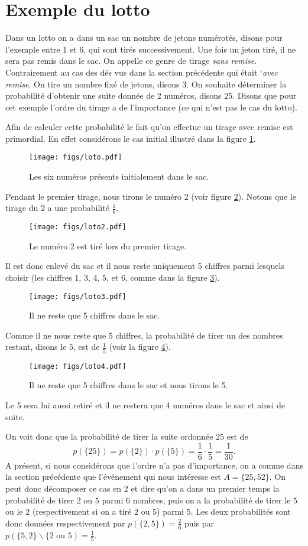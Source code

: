 \documentclass[a4paper,12pt]{book}
\begin{document}
\section{Exemple du lotto}
Dans un lotto on a dans un sac un nombre de jetons numérotés, disons pour l'exemple entre 1 et 6, 
qui sont tirés successivement. Une fois un jeton tiré, il ne sera pas remis dans le sac. 
On appelle ce genre de tirage \textit{sans remise}. Contrairement au cas des dés vus dans 
la section précédente qui était `\textit{avec remise}.
On tire un nombre fixé de jetons, disons 3. On souhaite déterminer la probabilité d'obtenir
une suite donnée de 2 numéros, disons $25$. Disons que pour cet exemple l'ordre du tirage a de l'importance
(ce qui n'est pas le cas du lotto).

Afin de calculer cette probabilité le fait qu'on effectue un tirage avec remise est primordial.
En effet considérons le cas initial illustré dans la figure \ref{fig_loto}.
\begin{figure}[htp]
\texttt{[image: figs/loto.pdf]}
\caption{Les six numéros présents initialement dans le sac.}\label{fig_loto}
\end{figure}
Pendant le premier tirage, nous tirons le numéro 2 (voir figure \ref{fig_loto2}). Notons que le tirage du 2 a une probabilité $\frac{1}{6}$.
\begin{figure}[htp]
\texttt{[image: figs/loto2.pdf]}
\caption{Le numéro 2 est tiré lors du premier tirage.}\label{fig_loto2}
\end{figure}
Il est donc enlevé du sac et il nous reste uniquement 5 chiffres parmi lesquels choisir 
(les chiffres $1$, $3$, $4$, $5$, et $6$, comme dans la figure \ref{fig_loto3}).
\begin{figure}[htp]
\texttt{[image: figs/loto3.pdf]}
\caption{Il ne reste que 5 chiffres dans le sac.}\label{fig_loto3}
\end{figure}
Comme il ne nous reste que 5 chiffres, la probabilité de tirer un des nombres restant, 
disons le $5$, est de $\frac{1}{5}$ (voir la figure \ref{fig_loto4}). 
\begin{figure}[htp]
\texttt{[image: figs/loto4.pdf]}
\caption{Il ne reste que 5 chiffres dans le sac et nous tirons le 5.}\label{fig_loto4}
\end{figure}
Le 5 sera lui aussi retiré et il ne restera que 4 numéros dans le sac et ainsi de suite. 

On voit donc que la probabilité de tirer la suite ordonnée $25$ est de
\begin{equation}
 p(\{25\})=p(\{2\})\cdot p(\{5\})=\frac{1}{6}\cdot\frac{1}{5}=\frac{1}{30}.
\end{equation}
A présent, si nous considérons que l'ordre n'a pas d'importance, on a comme dans la section précédente
que l'événement qui nous intéresse est $A=\{25,52\}$. On peut donc décomposer 
ce cas en 2 et dire qu'on a dans un premier temps la probabilité de tirer $2$ ou $5$ parmi 
$6$ nombres, puis on a la probabilité de tirer le $5$ ou le $2$ (respectivement si on a tiré $2$ ou $5$) parmi 5.
Les deux probabilités sont donc données respectivement par $p(\{2,5\})=\frac{2}{6}$ puis par $p(\{5,2\}\backslash \{2\mbox{ ou }5)=\frac{1}{5}$.
\end{document}
